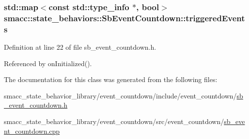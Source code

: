 \subsubsection[{\texorpdfstring{triggered\+Events}{triggeredEvents}}]{\setlength{\rightskip}{0pt plus 5cm}std\+::map$<$const std\+::type\+\_\+info $\ast$, {\bf bool}$>$ smacc\+::state\+\_\+behaviors\+::\+Sb\+Event\+Countdown\+::triggered\+Events\hspace{0.3cm}{\ttfamily [private]}}\hypertarget{classsmacc_1_1state__behaviors_1_1SbEventCountdown_ab921590a06b23ecbabecc9378040a667}{}\label{classsmacc_1_1state__behaviors_1_1SbEventCountdown_ab921590a06b23ecbabecc9378040a667}


Definition at line 22 of file sb\+\_\+event\+\_\+countdown.\+h.



Referenced by on\+Initialized().



The documentation for this class was generated from the following files\+:\begin{DoxyCompactItemize}
\item 
smacc\+\_\+state\+\_\+behavior\+\_\+library/event\+\_\+countdown/include/event\+\_\+countdown/\hyperlink{sb__event__countdown_8h}{sb\+\_\+event\+\_\+countdown.\+h}\item 
smacc\+\_\+state\+\_\+behavior\+\_\+library/event\+\_\+countdown/src/event\+\_\+countdown/\hyperlink{sb__event__countdown_8cpp}{sb\+\_\+event\+\_\+countdown.\+cpp}\end{DoxyCompactItemize}
